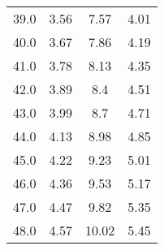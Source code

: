 \begin{table}
\begin{tabular}{cccc}
39.0 & 3.56 & 7.57 & 4.01 \\
40.0 & 3.67 & 7.86 & 4.19 \\
41.0 & 3.78 & 8.13 & 4.35 \\
42.0 & 3.89 & 8.4 & 4.51 \\
43.0 & 3.99 & 8.7 & 4.71 \\
44.0 & 4.13 & 8.98 & 4.85 \\
45.0 & 4.22 & 9.23 & 5.01 \\
46.0 & 4.36 & 9.53 & 5.17 \\
47.0 & 4.47 & 9.82 & 5.35 \\
48.0 & 4.57 & 10.02 & 5.45 \\
\end{tabular}
\end{table}
